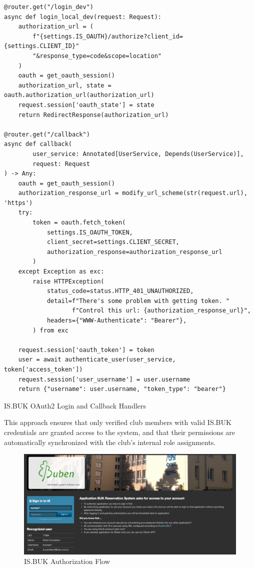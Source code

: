 \begin{listing}[H]
\begin{verbatim}
@router.get("/login_dev")
async def login_local_dev(request: Request):
    authorization_url = (
        f"{settings.IS_OAUTH}/authorize?client_id={settings.CLIENT_ID}"
        "&response_type=code&scope=location"
    )
    oauth = get_oauth_session()
    authorization_url, state = oauth.authorization_url(authorization_url)
    request.session['oauth_state'] = state
    return RedirectResponse(authorization_url)

@router.get("/callback")
async def callback(
        user_service: Annotated[UserService, Depends(UserService)],
        request: Request
) -> Any:
    oauth = get_oauth_session()
    authorization_response_url = modify_url_scheme(str(request.url), 'https')
    try:
        token = oauth.fetch_token(
            settings.IS_OAUTH_TOKEN,
            client_secret=settings.CLIENT_SECRET,
            authorization_response=authorization_response_url
        )
    except Exception as exc:
        raise HTTPException(
            status_code=status.HTTP_401_UNAUTHORIZED,
            detail=f"There's some problem with getting token. "
                   f"Control this url: {authorization_response_url}",
            headers={"WWW-Authenticate": "Bearer"},
        ) from exc

    request.session['oauth_token'] = token
    user = await authenticate_user(user_service, token['access_token'])
    request.session['user_username'] = user.username
    return {"username": user.username, "token_type": "bearer"}
\end{verbatim}
\caption{IS.BUK OAuth2 Login and Callback Handlers}
\label{list:auth-code-example}
\end{listing}

This approach ensures that only verified club members with valid IS.BUK credentials are granted access to the system, and that their permissions are automatically synchronized with the club’s internal role assignments.

\begin{figure}[!htbp]
  \centering
  \includegraphics[width=\linewidth]{images/is-buk-login}
  \caption{IS.BUK Authorization Flow~\cite{ISBUK}}
  \label{fig:is.buk authorization}
\end{figure}

